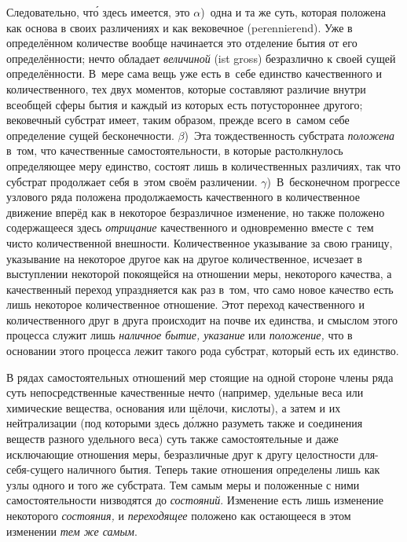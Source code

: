 Следовательно, чт\'{о} здесь имеется, это $\alpha$)~одна и та же суть,
которая положена как основа в своих различениях и как вековечное
(peren\-nie\-rend). Уже в определённом количестве вообще начинается это
отделение бытия от его определённости; нечто обладает {\em величиной} (ist
gross) безразлично к своей сущей определённости. В~мере сама вещь уже есть
в~себе единство качественного и количественного, тех двух моментов, которые
составляют различие внутри всеобщей сферы бытия и каждый из которых есть
потустороннее другого; вековечный субстрат имеет, таким образом, прежде всего
в~самом себе определение сущей бесконечности. $\beta$)~Эта тождественность
субстрата {\em положена} в~том, что качественные самостоятельности, в которые
растолкнулось определяющее меру единство, состоят лишь в количественных
различиях, так что субстрат продолжает себя в~этом своём различении.
$\gamma$)~В~бесконечном прогрессе узлового ряда положена продолжаемость
качественного в количественное движение вперёд как в некоторое безразличное
изменение, но также положено содержащееся здесь {\em отрицание} качественного и
одновременно вместе с~тем чисто количественной внешности. Количественное
указывание за свою границу, указывание на некоторое другое как на другое
количественное, исчезает в выступлении некоторой покоящейся на отношении меры,
некоторого качества, а качественный переход упраздняется как раз в~том, что
само новое качество есть лишь некоторое количественное отношение. Этот переход
качественного и количественного друг в друга происходит на почве их единства, и
смыслом этого процесса служит лишь {\em наличное бытие, указание} или
{\em положение,} что в основании этого процесса лежит такого рода субстрат,
который есть их единство.

В рядах самостоятельных отношений мер стоящие на одной стороне члены ряда суть
непосредственные качественные нечто (например, удельные веса или химические
вещества, основания или щёлочи, кислоты), а затем и их нейтрализации (под
которыми здесь д\'{о}лжно разуметь также и соединения веществ разного удельного
веса) суть также самостоятельные и даже исключающие отношения меры,
безразличные друг к другу целостности для-себя-сущего наличного бытия. Теперь
такие отношения определены лишь как узлы одного и того же субстрата. Тем самым
меры и положенные с ними самостоятельности низводятся до {\em состояний}.
Изменение есть лишь изменение некоторого {\em состояния,} и {\em переходящее}
положено как остающееся в этом изменении {\em тем же самым}.


